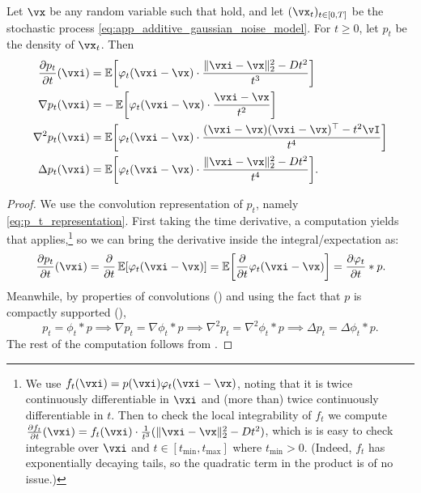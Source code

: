 \documentclass[../../book-main.tex]{subfiles}
\begin{document}
\begin{proposition}\label{prop:p_t_derivatives}
    Let \(\vx\) be any random variable such that  hold, and let \((\vx_{t})_{t \in [0, T]}\) be the stochastic process \eqref{eq:app_additive_gaussian_noise_model}. For \(t \geq 0\), let \(p_{t}\) be the density of \(\vx_{t}\). Then
    \begin{align}
        \pdv{p_{t}}{t}(\vxi)
        &= \Ex\rs{\phi_{t}(\vxi - \vx)\cdot\frac{\norm{\vxi - \vx}_{2}^{2} - Dt^{2}}{t^{3}}} \\
        \nabla p_{t}(\vxi)
        &= -\Ex\rs{\phi_{t}(\vxi - \vx)\cdot\frac{\vxi - \vx}{t^{2}}} \\
        \nabla^{2}p_{t}(\vxi)
        &= \Ex\rs{\phi_{t}(\vxi - \vx)\cdot\frac{(\vxi - \vx)(\vxi - \vx)^{\top} - t^{2}\vI}{t^{4}}} \\ 
        \Delta p_{t}(\vxi)
        &= \Ex\rs{\phi_{t}(\vxi - \vx)\cdot\frac{\norm{\vxi - \vx}_{2}^{2} - Dt^{2}}{t^{4}}}.
    \end{align}
\end{proposition}
\begin{proof} 
    We use the convolution representation of \(p_{t}\), namely \eqref{eq:p_t_representation}. First taking the time derivative, a computation yields that  applies,\footnote{We use \(f_{t}(\vxi) = p(\vxi) \phi_{t}(\vxi - \vx)\), noting that it is twice continuously differentiable in \(\vxi\) and (more than) twice continuously differentiable in \(t\). Then to check the local integrability of \(f_{t}\) we compute \(\pdv{f_{t}}{t}(\vxi) = f_{t}(\vxi)\cdot \frac{1}{t^{3}}(\norm{\vxi - \vx}_{2}^{2} - Dt^{2})\), which is is easy to check integrable over \(\vxi\) and \(t \in [t_{\min}, t_{\max}]\) where \(t_{\min} > 0\). (Indeed, \(f_{t}\) has exponentially decaying tails, so the quadratic term in the product is of no issue.)} so we can bring the derivative inside the integral/expectation as:
    \begin{equation}
        \pdv{p_{t}}{t}(\vxi) = \pdv*{\Ex[\phi_{t}(\vxi - \vx)]}{t} = \Ex\rs{\pdv*{\phi_{t}(\vxi - \vx)}{t}} = \pdv{\phi_{t}}{t} * p.
    \end{equation}
    Meanwhile, by properties of convolutions () and using the fact that \(p\) is compactly supported (),
    \begin{equation}
        p_{t} = \phi_{t} * p \implies \nabla p_{t} = \nabla \phi_{t} * p \implies \nabla^{2}p_{t} = \nabla^{2}\phi_{t} * p \implies \Delta p_{t} = \Delta \phi_{t} * p.
    \end{equation}
    The rest of the computation follows from .
\end{proof}
\end{document}

